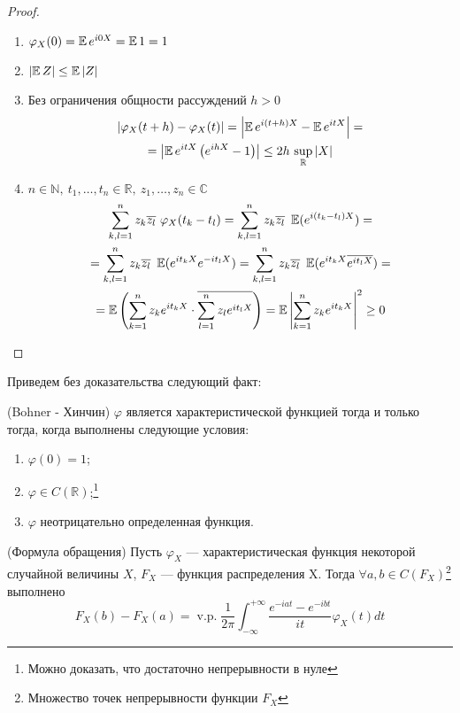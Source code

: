         \begin{proof}
            \
            \begin{enumerate}
                \item $\varphi_X(0)=\operatorname*{\mathbb{E}} e^{i 0 X} = \operatorname*{\mathbb{E}} 1 = 1$
                \item $\left|\operatorname*{\mathbb{E}} Z\right|\leq \operatorname*{\mathbb{E}}\left|Z\right|$
                \item Без ограничения общности рассуждений $h > 0$\begin{multline*}|\varphi_X(t+h)-\varphi_X(t)|=\left|\operatorname*{\mathbb{E}} e^{i(t+h)X} - \operatorname*{\mathbb{E}} e^{itX}\right|  =\\= \left|\operatorname*{\mathbb{E}} e^{itX} \left(e^{ihX}-1\right)\right|\leq 2h \ \displaystyle{\sup_{\mathbb{R}}}\left|X\right|\end{multline*}
                \item $n\in\mathbb{N}, \ t_1, \dots, t_n \in \mathbb{R}, \ z_1, \dots, z_n \in \mathbb{C}$
                    \begin{multline*}
                        \sum_{k, l = 1}^{n} z_k \overline{z_l} \ \varphi_X(t_k-t_l) = \sum_{k, l = 1}^{n} z_k \overline{z_l} \ \E(e^{i(t_k-t_l)X}) =\\=  \sum_{k, l = 1}^{n} z_k \overline{z_l} \ \E(e^{it_kX}e^{-it_lX})
                        = \sum_{k, l = 1}^{n} z_k \overline{z_l} \ \E(e^{it_kX}\overline{e^{it_lX}}) =\\= \E\left(\sum_{k=1}^{n}z_ke^{it_kX}\cdot \overline{\sum_{l=1}^{n}z_le^{it_lX}}\right)= \E \left|\sum_{k=1}^{n}z_ke^{it_kX}\right|^2\geq 0
                    \end{multline*}
            \end{enumerate}
        \end{proof}
        Приведем без доказательства следующий факт:
        \begin{theorem}\label{lect11:th2}
            (Bohner - Хинчин)
            $\varphi$ является характеристической функцией тогда и только тогда, когда выполнены следующие условия:
            \begin{enumerate}
                \item $\varphi(0)=1$;
                \item $\varphi\in C(\mathbb{R})$;\footnote{Можно доказать, что достаточно непрерывности в нуле}
                \item $\varphi$ неотрицательно определенная функция.
            \end{enumerate}
        \end{theorem}
        \begin{theorem}\label{lect11:th3}
            (Формула обращения)
            Пусть $\varphi_X$ --- характеристическая функция некоторой случайной величины $X$, $F_X$ --- функция распределения X.
            Тогда $\forall a, b \in C(F_X)$\footnote{Множество точек непрерывности функции $F_X$} выполнено
            \begin{equation*}
                F_X(b) - F_X(a) = \operatorname{v.p. }\frac{1}{2\pi}\int_{-\infty}^{+\infty} \frac{e^{-iat} - e^{-ibt}}{it}\varphi_X(t)dt
            \end{equation*}
        \end{theorem}
